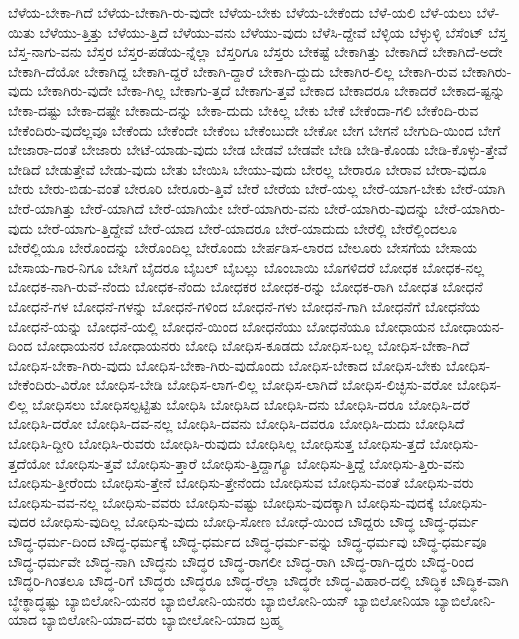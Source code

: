 {ಬೆಳೆಯ-ಬೇಕಾ-ಗಿದೆ
ಬೆಳೆಯ-ಬೇಕಾಗಿ-ರು-ವುದೇ
ಬೆಳೆಯ-ಬೇಕು
ಬೆಳೆಯ-ಬೇಕೆಂದು
ಬೆಳೆ-ಯಲಿ
ಬೆಳೆ-ಯಲು
ಬೆಳೆ-ಯಿತು
ಬೆಳೆಯು-ತ್ತಿತ್ತು
ಬೆಳೆಯು-ತ್ತಿದೆ
ಬೆಳೆಯು-ವನು
ಬೆಳೆಯು-ವುದು
ಬೆಳೆಸಿ-ದ್ದೇವೆ
ಬೆಳ್ಳಿಯ
ಬೆಳ್ಳುಳ್ಳಿ
ಬೆಸೆಂಟ್
ಬೆಸ್ತ
ಬೆಸ್ತ-ನಾಗು-ವನು
ಬೆಸ್ತರ
ಬೆಸ್ತರ-ಪಡೆಯ-ನ್ನೆಲ್ಲಾ
ಬೆಸ್ತರಿಗೂ
ಬೆಸ್ತರು
ಬೇಕಷ್ಟೆ
ಬೇಕಾಗಿತ್ತು
ಬೇಕಾಗಿದೆ
ಬೇಕಾಗಿದೆ-ಅದೇ
ಬೇಕಾಗಿ-ದೆಯೋ
ಬೇಕಾಗಿದ್ದ
ಬೇಕಾಗಿ-ದ್ದರೆ
ಬೇಕಾಗಿ-ದ್ದಾರೆ
ಬೇಕಾಗಿ-ದ್ದುದು
ಬೇಕಾಗಿರ-ಲಿಲ್ಲ
ಬೇಕಾಗಿ-ರುವ
ಬೇಕಾಗಿರು-ವುದು
ಬೇಕಾಗಿರು-ವುದೇ
ಬೇಕಾ-ಗಿಲ್ಲ
ಬೇಕಾಗು-ತ್ತದೆ
ಬೇಕಾಗು-ತ್ತವೆ
ಬೇಕಾದ
ಬೇಕಾದರೂ
ಬೇಕಾದರೆ
ಬೇಕಾದ-ಷ್ಟನ್ನು
ಬೇಕಾ-ದಷ್ಟು
ಬೇಕಾ-ದಷ್ಟೇ
ಬೇಕಾದು-ದನ್ನು
ಬೇಕಾ-ದುದು
ಬೇಕಿಲ್ಲ
ಬೇಕು
ಬೇಕೆ
ಬೇಕೆಂದಾ-ಗಲಿ
ಬೇಕೆಂದಿ-ರುವ
ಬೇಕೆಂದಿರು-ವುದೆಲ್ಲವೂ
ಬೇಕೆಂದು
ಬೇಕೆಂದೇ
ಬೇಕೆಂಬ
ಬೇಕೆಂಬುದೇ
ಬೇಕೋ
ಬೇಗ
ಬೇಗನೆ
ಬೇಗುದಿ-ಯಿಂದ
ಬೇಗೆ
ಬೇಜಾರಾ-ದಂತೆ
ಬೇಜಾರು
ಬೇಟೆ-ಯಾಡು-ವುದು
ಬೇಡ
ಬೇಡವೆ
ಬೇಡವೇ
ಬೇಡಿ
ಬೇಡಿ-ಕೊಂಡು
ಬೇಡಿ-ಕೊಳ್ಳು-ತ್ತೇವೆ
ಬೇಡಿದೆ
ಬೇಡುತ್ತೇವೆ
ಬೇಡು-ವುದು
ಬೇತು
ಬೇಯಿಸಿ
ಬೇಯು-ವುದು
ಬೇರಲ್ಲ
ಬೇರಾರೂ
ಬೇರಾವ
ಬೇರಾ-ವುದೂ
ಬೇರು
ಬೇರು-ಬಿಡು-ವಂತೆ
ಬೇರೂರಿ
ಬೇರೂರು-ತ್ತಿವೆ
ಬೇರೆ
ಬೇರೆಯ
ಬೇರೆ-ಯಲ್ಲ
ಬೇರೆ-ಯಾಗ-ಬೇಕು
ಬೇರೆ-ಯಾಗಿ
ಬೇರೆ-ಯಾಗಿತ್ತು
ಬೇರೆ-ಯಾಗಿದೆ
ಬೇರೆ-ಯಾಗಿಯೇ
ಬೇರೆ-ಯಾಗಿರು-ವನು
ಬೇರೆ-ಯಾಗಿರು-ವುದನ್ನು
ಬೇರೆ-ಯಾಗಿರು-ವುದು
ಬೇರೆ-ಯಾಗು-ತ್ತಿದ್ದೇವೆ
ಬೇರೆ-ಯಾದ
ಬೇರೆ-ಯಾದರೂ
ಬೇರೆ-ಯಾದುದು
ಬೇರೆಲ್ಲಿ
ಬೇರೆಲ್ಲಿಂದಲೂ
ಬೇರೆಲ್ಲಿಯೂ
ಬೇರೊಂದನ್ನು
ಬೇರೊಂದಿಲ್ಲ
ಬೇರೊಂದು
ಬೇರ್ಪಡಿಸ-ಲಾರದ
ಬೇಲೂರು
ಬೇಸಗೆಯ
ಬೇಸಾಯ
ಬೇಸಾಯ-ಗಾರ-ನಿಗೂ
ಬೇಸಿಗೆ
ಬೈದರೂ
ಬೈಬಲ್
ಬೈಬಲ್ಲು
ಬೊಂಬಾಯಿ
ಬೊಗಳಿದರೆ
ಬೋಧಕ
ಬೋಧಕ-ನಲ್ಲ
ಬೋಧಕ-ನಾಗಿ-ರುವೆ-ನೆಂದು
ಬೋಧಕ-ನೆಂದು
ಬೋಧಕರ
ಬೋಧಕ-ರನ್ನು
ಬೋಧಕ-ರಾಗಿ
ಬೋಧತ
ಬೋಧನೆ
ಬೋಧನೆ-ಗಳ
ಬೋಧನೆ-ಗಳನ್ನು
ಬೋಧನೆ-ಗಳಿಂದ
ಬೋಧನೆ-ಗಳು
ಬೋಧನೆ-ಗಾಗಿ
ಬೋಧನೆಗೆ
ಬೋಧನೆಯ
ಬೋಧನೆ-ಯನ್ನು
ಬೋಧನೆ-ಯಲ್ಲಿ
ಬೋಧನೆ-ಯಿಂದ
ಬೋಧನೆಯು
ಬೋಧನೆಯೂ
ಬೋಧಾಯನ
ಬೋಧಾಯನ-ದಿಂದ
ಬೋಧಾಯನರ
ಬೋಧಾಯನರು
ಬೋಧಿ
ಬೋಧಿಸ-ಕೂಡದು
ಬೋಧಿಸ-ಬಲ್ಲ
ಬೋಧಿಸ-ಬೇಕಾ-ಗಿದೆ
ಬೋಧಿಸ-ಬೇಕಾ-ಗಿರು-ವುದು
ಬೋಧಿಸ-ಬೇಕಾ-ಗಿರು-ವುದೊಂದು
ಬೋಧಿಸ-ಬೇಕಾದ
ಬೋಧಿಸ-ಬೇಕು
ಬೋಧಿಸ-ಬೇಕೆಂದಿರು-ವಿರೋ
ಬೋಧಿಸ-ಬೇಡಿ
ಬೋಧಿಸ-ಲಾಗ-ಲಿಲ್ಲ
ಬೋಧಿಸ-ಲಾಗಿದೆ
ಬೋಧಿಸ-ಲಿಚ್ಛಿಸು-ವರೋ
ಬೋಧಿಸ-ಲಿಲ್ಲ
ಬೋಧಿಸಲು
ಬೋಧಿಸಲ್ಪಟ್ಟಿತು
ಬೋಧಿಸಿ
ಬೋಧಿಸಿದ
ಬೋಧಿಸಿ-ದನು
ಬೋಧಿಸಿ-ದರೂ
ಬೋಧಿಸಿ-ದರೆ
ಬೋಧಿಸಿ-ದರೋ
ಬೋಧಿಸಿ-ದವ-ನಲ್ಲ
ಬೋಧಿಸಿ-ದವನು
ಬೋಧಿಸಿ-ದವರೂ
ಬೋಧಿಸಿ-ದುದು
ಬೋಧಿಸಿದೆ
ಬೋಧಿಸಿ-ದ್ದೀರಿ
ಬೋಧಿಸಿ-ರುವರು
ಬೋಧಿಸಿ-ರುವುದು
ಬೋಧಿಸಿಲ್ಲ
ಬೋಧಿಸುತ್ತ
ಬೋಧಿಸು-ತ್ತದೆ
ಬೋಧಿಸು-ತ್ತದೆಯೋ
ಬೋಧಿಸು-ತ್ತವೆ
ಬೋಧಿಸು-ತ್ತಾರೆ
ಬೋಧಿಸು-ತ್ತಿದ್ದಾಗ್ಯೂ
ಬೋಧಿಸು-ತ್ತಿದ್ದೆ
ಬೋಧಿಸು-ತ್ತಿರು-ವನು
ಬೋಧಿಸು-ತ್ತೀರೆಂದು
ಬೋಧಿಸು-ತ್ತೇನೆ
ಬೋಧಿಸು-ತ್ತೇನೆಂದು
ಬೋಧಿಸುವ
ಬೋಧಿಸು-ವಂತೆ
ಬೋಧಿಸು-ವರು
ಬೋಧಿಸು-ವವ-ನಲ್ಲ
ಬೋಧಿಸು-ವವರು
ಬೋಧಿಸು-ವಷ್ಟು
ಬೋಧಿಸು-ವುದಕ್ಕಾಗಿ
ಬೋಧಿಸು-ವುದಕ್ಕೆ
ಬೋಧಿಸು-ವುದರ
ಬೋಧಿಸು-ವುದಿಲ್ಲ
ಬೋಧಿಸು-ವುದು
ಬೋಧಿ-ಸೋಣ
ಬೋಧೆ-ಯಿಂದ
ಬೌದ್ದರು
ಬೌದ್ಧ
ಬೌದ್ಧ-ಧರ್ಮ
ಬೌದ್ಧ-ಧರ್ಮ-ದಿಂದ
ಬೌದ್ಧ-ಧರ್ಮಕ್ಕೆ
ಬೌದ್ಧ-ಧರ್ಮದ
ಬೌದ್ಧ-ಧರ್ಮ-ವನ್ನು
ಬೌದ್ಧ-ಧರ್ಮವು
ಬೌದ್ಧ-ಧರ್ಮವೂ
ಬೌದ್ಧ-ಧರ್ಮವೇ
ಬೌದ್ಧ-ನಾಗಿ
ಬೌದ್ಧನು
ಬೌದ್ಧರ
ಬೌದ್ಧ-ರಾಗಲೀ
ಬೌದ್ಧ-ರಾಗಿ
ಬೌದ್ಧ-ರಾಗಿ-ದ್ದರು
ಬೌದ್ಧ-ರಿಂದ
ಬೌದ್ಧರಿ-ಗಿಂತಲೂ
ಬೌದ್ಧ-ರಿಗೆ
ಬೌದ್ಧರು
ಬೌದ್ಧರೂ
ಬೌದ್ಧ-ರೆಲ್ಲಾ
ಬೌದ್ಧರೇ
ಬೌದ್ಧ-ವಿಹಾರ-ದಲ್ಲಿ
ಬೌದ್ಧಿಕ
ಬೌದ್ಧಿಕ-ವಾಗಿ
ಬ್ಧೇಕ್ಧಾದ್ಧಷ್ಟು
ಬ್ಯಾಬಿಲೋನಿ-ಯನರ
ಬ್ಯಾಬಿಲೋನಿ-ಯನರು
ಬ್ಯಾಬಿಲೋನಿ-ಯನ್
ಬ್ಯಾಬಿಲೋನಿಯಾ
ಬ್ಯಾಬಿಲೋನಿ-ಯಾದ
ಬ್ಯಾಬಿಲೋನಿ-ಯಾದ-ವರು
ಬ್ಯಾಬೀಲೋನಿ-ಯಾದ
ಬ್ರಹ್ಮ
}
